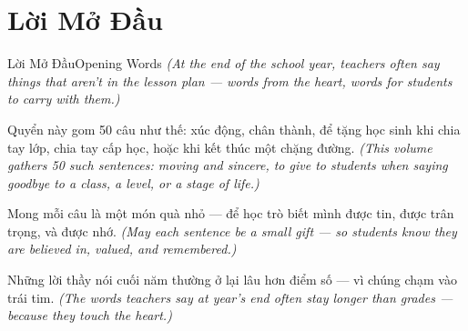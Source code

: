 \chapter*{Lời Mở Đầu}

\begin{truyen}{Lời Mở Đầu}{Opening Words}
\textit{(At the end of the school year, teachers often say things that aren't in the lesson plan — words from the heart, words for students to carry with them.)}

Quyển này gom 50 câu như thế: xúc động, chân thành, để tặng học sinh khi chia tay lớp, chia tay cấp học, hoặc khi kết thúc một chặng đường.
\textit{(This volume gathers 50 such sentences: moving and sincere, to give to students when saying goodbye to a class, a level, or a stage of life.)}

Mong mỗi câu là một món quà nhỏ — để học trò biết mình được tin, được trân trọng, và được nhớ.
\textit{(May each sentence be a small gift — so students know they are believed in, valued, and remembered.)}
\end{truyen}

\begin{baihoc}
Những lời thầy nói cuối năm thường ở lại lâu hơn điểm số — vì chúng chạm vào trái tim.
\textit{(The words teachers say at year's end often stay longer than grades — because they touch the heart.)}
\end{baihoc}
\ngancach
